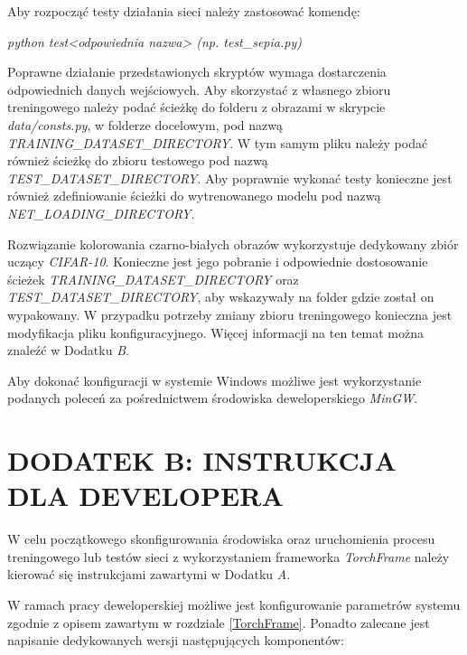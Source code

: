   \noindent
  Aby rozpocząć testy działania sieci należy zastosować komendę:

  \textit{python test<odpowiednia nazwa> (np. test\_sepia.py)}

  Poprawne działanie przedstawionych skryptów wymaga dostarczenia odpowiednich
  danych wejściowych. Aby skorzystać z własnego zbioru treningowego należy podać
  ścieżkę do folderu z obrazami w skrypcie \textit{data/consts.py}, w folderze docelowym,
  pod nazwą \textit{TRAINING\_DATASET\_DIRECTORY}. W tym samym pliku należy podać
  również ścieżkę do zbioru testowego pod nazwą \textit{TEST\_DATASET\_DIRECTORY}.
  Aby poprawnie wykonać testy konieczne jest również zdefiniowanie ścieżki do
  wytrenowanego modelu pod nazwą \textit{NET\_LOADING\_DIRECTORY}.

  Rozwiązanie kolorowania czarno-białych obrazów wykorzystuje dedykowany
  zbiór uczący \textit{CIFAR-10}. Konieczne jest jego pobranie i
  odpowiednie dostosowanie ścieżek \textit{TRAINING\_DATASET\_DIRECTORY}
  oraz \textit{TEST\_DATASET\_DIRECTORY}, aby wskazywały na folder gdzie został
  on wypakowany. W przypadku potrzeby zmiany zbioru treningowego konieczna jest
  modyfikacja pliku konfiguracyjnego. Więcej informacji na ten temat można znaleźć
  w Dodatku \textit{B}.

  Aby dokonać konfiguracji w systemie Windows możliwe jest wykorzystanie
  podanych poleceń za pośrednictwem środowiska deweloperskiego \textit{MinGW}.

\newpage
\section*{DODATEK B: INSTRUKCJA DLA DEVELOPERA}

  W celu początkowego skonfigurowania środowiska oraz uruchomienia procesu
  treningowego lub testów sieci z wykorzystaniem frameworka \textit{TorchFrame}
  należy kierować się instrukcjami zawartymi w Dodatku \textit{A}.

  W ramach pracy deweloperskiej możliwe jest konfigurowanie parametrów systemu
  zgodnie z opisem zawartym w rozdziale \ref{TorchFrame}. Ponadto zalecane jest
  napisanie dedykowanych wersji następujących komponentów:

